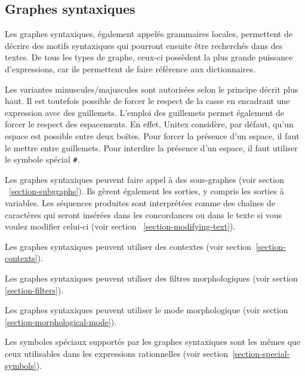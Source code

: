 \subsection{Graphes syntaxiques}
\label{syntactic-graphs}
Les graphes syntaxiques, également appelés grammaires locales, permettent de décrire
des motifs syntaxiques qui pourront ensuite être recherchés dans des textes. De tous les
types de graphe, ceux-ci possèdent la plus grande puissance d’expressions, car ils permettent
de faire référence aux dictionnaires.

\bigskip
\noindent Les variantes minuscules/majuscules sont autorisées selon le principe décrit plus haut.
Il est toutefois possible de forcer le respect de la casse en encadrant une expression avec des
guillemets. L’emploi des guillemets permet également de forcer le respect des espacements.
En effet, Unitex considère, par défaut, qu’un espace est possible entre deux boîtes. Pour forcer
la présence d’un espace, il faut le mettre entre guillemets. Pour interdire la présence d’un
espace, il faut utiliser le symbole spécial \verb+#+.\index{\verb+#+}

\bigskip
\noindent Les graphes syntaxiques peuvent faire appel à des sous-graphes (voir section
~\ref{section-subgraphs}). Ils gèrent également les sorties, y compris les sorties à variables.
Les séquences produites sont interprétées comme des chaînes de caractères qui seront insérées
dans les concordances ou dans le texte si vous voulez modifier celui-ci (voir section
~\ref{section-modifying-text}).

\bigskip
\noindent Les graphes syntaxiques peuvent utiliser des contextes (voir section~\ref{section-contexts}).

\bigskip
\noindent Les graphes syntaxiques peuvent utiliser des filtres morphologiques (voir section
\ref{section-filters}).

\bigskip
\noindent Les graphes syntaxiques peuvent utiliser le mode morphologique (voir section
\ref{section-morphological-mode}).

\bigskip
\noindent Les symboles spéciaux supportés par les graphes syntaxiques sont les mêmes que ceux
utilisables dans les expressions rationnelles (voir section~\ref{section-special-symbols}).

